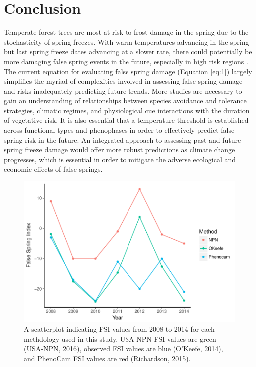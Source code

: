 \documentclass{article}\usepackage[]{graphicx}\usepackage[]{color}
\makeatletter
\def\maxwidth{ %
  \ifdim\Gin@nat@width>\linewidth
    \linewidth
  \else
    \Gin@nat@width
  \fi
}
\makeatother
\begin{document}
\section{Conclusion}
Temperate forest trees are most at risk to frost damage in the spring due to the stochasticity of spring freezes. With warm temperatures advancing in the spring but last spring freeze dates advancing at a slower rate, there could potentially be more damaging false spring events in the future, especially in high risk regions \citep{Gu2008, Inouye2008}. The current equation for evaluating false spring damage (Equation \ref{eq:1}) largely simplifies the myriad of complexities involved in assessing false spring damage and risks inadequately predicting future trends. More studies are necessary to gain an understanding of relationships between species avoidance and tolerance strategies, climatic regimes, and physiological cue interactions with the duration of vegetative risk. It is also essential that a temperature threshold is established across functional types and phenophases in order to effectively predict false spring risk in the future. An integrated approach to assessing past and future spring freeze damage would offer more robust predictions as climate change progresses, which is essential in order to mitigate the adverse ecological and economic effects of false springs.

\nocite{Soudani2012}
\nocite{White2009}
\nocite{Schaber2005}
\nocite{Schwartz1993}
\nocite{Barker2005}
\nocite{Sanchez2013}
\nocite{Longstroth2012}
\nocite{Barlow2015}
\nocite{Longstroth2013}



\begin{figure}[H]

{\centering \includegraphics[width=\maxwidth]{figure/fsifig-1} 

}

\caption[A scatterplot indicating FSI values from 2008 to 2014 for each methdology used in this study]{A scatterplot indicating FSI values from 2008 to 2014 for each methdology used in this study. USA-NPN FSI values are green (USA-NPN, 2016), observed FSI values are blue (O'Keefe, 2014), and PhenoCam FSI values are red (Richardson, 2015).}\label{fig:fsifig}
\end{figure}
\end{document}
